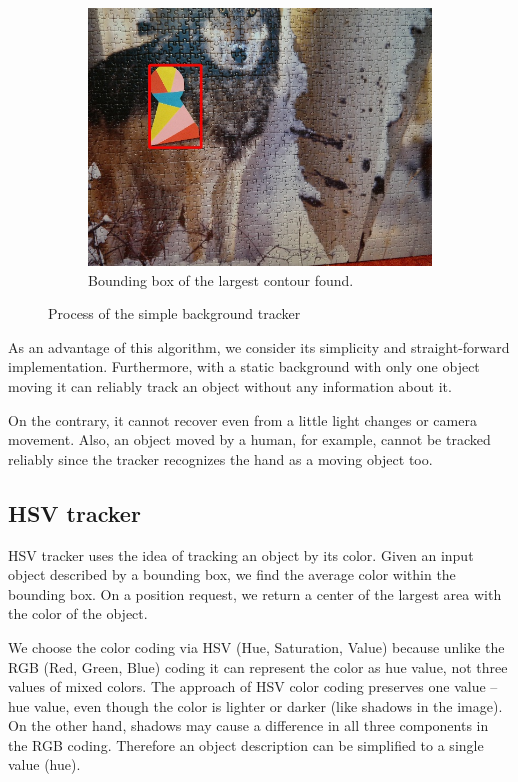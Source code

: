 \begin{figure}
\begin{subfigure}[b]{0.48\linewidth}
    \includegraphics[width=\linewidth]{img/simple_background/result.jpg}
    \caption{Bounding box of the largest contour found.}
  \end{subfigure}
  \caption{Process of the simple background tracker}
  \label{fig:simple-background-tracker}
\end{figure}

As an advantage of this algorithm, we consider its simplicity and
straight-forward implementation. Furthermore, with a static background with
only one object moving it can reliably track an object without any information
about it.

On the contrary, it cannot recover even from a little light changes or camera
movement. Also, an object moved by a human, for example, cannot be tracked
reliably since the tracker recognizes the hand as a moving object
too.

\subsection{HSV tracker}

HSV tracker uses the idea of tracking an object by its color. Given an input
object described by a bounding box, we find the average color within the
bounding box. On a position request, we return a center of the largest area
with the color of the object.

We choose the color coding via HSV (Hue, Saturation, Value) because unlike the RGB (Red,
Green, Blue) coding it can represent the color as hue value, not three values of
mixed colors. The approach of HSV color coding preserves one value -- hue
value,  even though the color is lighter or darker (like shadows in the image).
On the other hand, shadows may cause a difference in all three
components in the RGB coding. Therefore an object description can be simplified
to a single value (hue).

